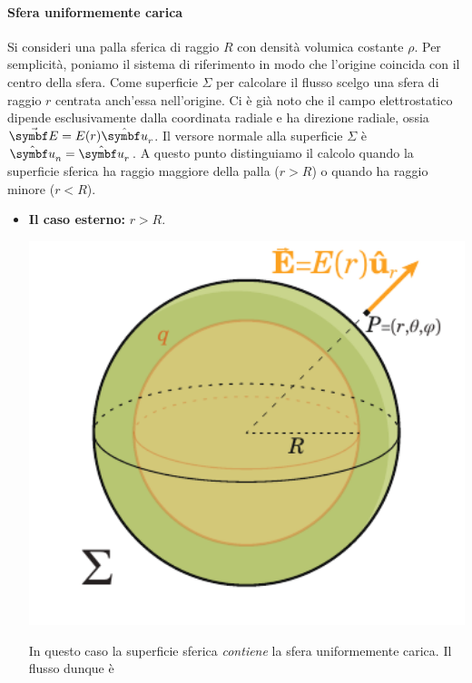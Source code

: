 \paragraph{Sfera uniformemente carica}
Si consideri una palla sferica di raggio $R$ con densità volumica costante $\rho$. Per semplicità, poniamo il sistema di riferimento in modo che l'origine coincida con il centro della sfera. Come superficie $\Sigma$ per calcolare il flusso scelgo una sfera di raggio $r$ centrata anch'essa nell'origine.
Ci è già noto che il campo elettrostatico dipende esclusivamente dalla coordinata radiale e ha direzione radiale, ossia $\vba{E}=E(r)\vbh{u}_r$. Il versore normale alla superficie $\Sigma$ è $\vbh{u}_n=\vbh{u}_r$.
A questo punto distinguiamo il calcolo quando la superficie sferica ha raggio maggiore della palla ($r>R$) o quando ha raggio minore ($r<R$).
\begin{itemize}
	\item \textbf{Il caso esterno:} $r>R$.\\
	\begin{minipage}{0.4\textwidth}
		\begin{center}
			\includegraphics[width=1\textwidth]{images/chp2/chp2sferacarica1.pdf}
		\end{center}
	\end{minipage}
	\begin{minipage}{0.5\textwidth}
		In questo caso la superficie sferica \textit{contiene} la sfera uniformemente carica. Il flusso dunque è

\end{minipage}
\end{itemize}
